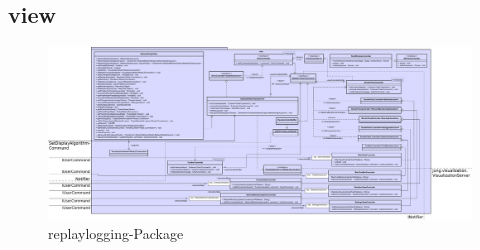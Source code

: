 \subsection{view}
\label{subsec:view}

\clearpage
\begin{figure}
  \centering
  \includegraphics[width=\textwidth]{../diagramimages/view.png}
  \caption{replaylogging-Package}
\end{figure}
\clearpage
